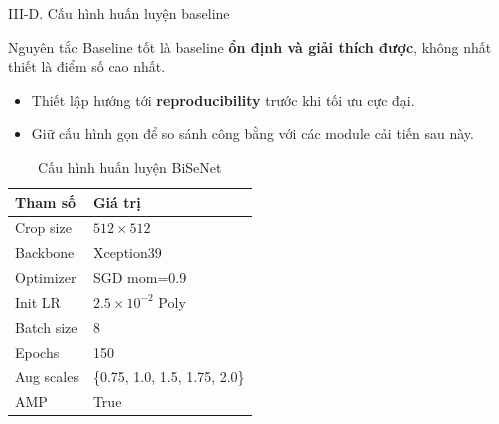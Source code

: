 \begin{frame}{III-D. Cấu hình huấn luyện baseline}
          \begin{alertblock}{Nguyên tắc}
        Baseline tốt là baseline \textbf{ổn định và giải thích được}, không nhất thiết là điểm số cao nhất.
      \end{alertblock}
      \begin{itemize}
        \item Thiết lập hướng tới \textbf{reproducibility} trước khi tối ưu cực đại.
        \item Giữ cấu hình gọn để so sánh công bằng với các module cải tiến sau này.
      \end{itemize}


      \begin{table}
        \tiny
        \begin{tabular}{ll}
          \toprule
          \textbf{Tham số} & \textbf{Giá trị} \\
          \midrule
          Crop size    & $512\times512$ \\
          Backbone     & Xception39 \\
          Optimizer    & SGD mom=0.9 \\
          Init LR      & $2.5\times10^{-2}$ Poly \\
          Batch size   & 8 \\
          Epochs       & 150 \\
          Aug scales   & \{0.75, 1.0, 1.5, 1.75, 2.0\} \\
          AMP          & True \\
          \bottomrule
        \end{tabular}
        \caption{Cấu hình huấn luyện BiSeNet}
      \end{table}
\end{frame}
